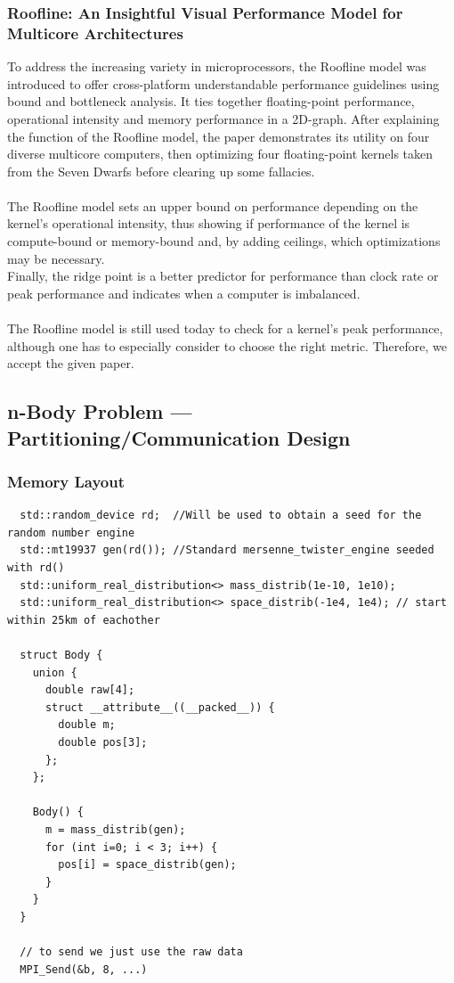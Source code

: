 \documentclass[]{scrartcl}
\begin{document}
\subsubsection{Roofline: An Insightful Visual Performance Model for Multicore Architectures}
To address the increasing variety in microprocessors, the Roofline model was introduced to offer cross-platform understandable performance guidelines using bound and bottleneck analysis. It ties together floating-point performance, operational intensity and memory performance in a 2D-graph. After explaining the function of the Roofline model, the paper demonstrates its utility on four diverse multicore computers, then optimizing four floating-point kernels taken from the Seven Dwarfs before clearing up some fallacies.\\\\
The Roofline model sets an upper bound on performance depending on the kernel's operational intensity, thus showing if performance of the kernel is compute-bound or memory-bound and, by adding ceilings, which optimizations may be necessary.\\
Finally, the ridge point is a better predictor for performance than clock rate or peak performance and indicates when a computer is imbalanced.\\\\
The Roofline model is still used today to check for a kernel's peak performance, although one has to especially consider to choose the right metric. Therefore, we accept the given paper. 
\subsection{n-Body Problem --- Partitioning/Communication Design}
\subsubsection{Memory Layout}

\begin{verbatim}
  std::random_device rd;  //Will be used to obtain a seed for the random number engine
  std::mt19937 gen(rd()); //Standard mersenne_twister_engine seeded with rd()
  std::uniform_real_distribution<> mass_distrib(1e-10, 1e10);
  std::uniform_real_distribution<> space_distrib(-1e4, 1e4); // start within 25km of eachother

  struct Body {
    union {
      double raw[4];
      struct __attribute__((__packed__)) {
        double m;
        double pos[3];
      };
    };

    Body() {
      m = mass_distrib(gen);
      for (int i=0; i < 3; i++) {
        pos[i] = space_distrib(gen);
      }
    }
  }

  // to send we just use the raw data
  MPI_Send(&b, 8, ...)
\end{verbatim}
\end{document}

